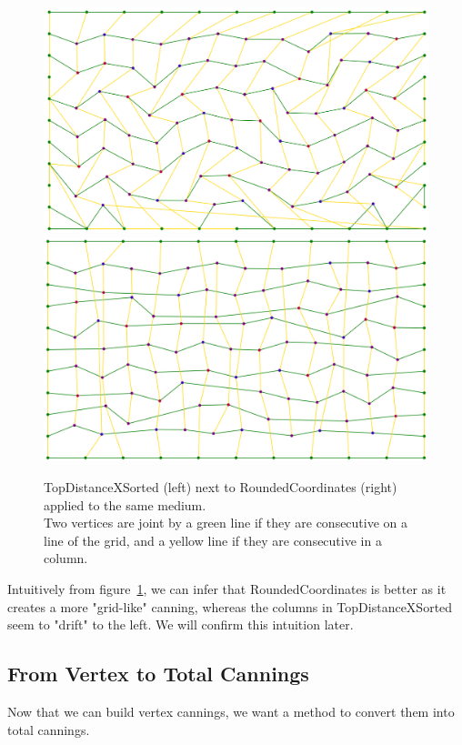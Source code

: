 \documentclass{article}
\begin{document}
\begin{figure}[h]
	\centering\includegraphics[width=0.45\linewidth]{assets/TopDistanceXSorted.png}
	\centering\includegraphics[width=0.45\linewidth]{assets/RoundedCoordinates.png}
	\caption{TopDistanceXSorted (left) next to RoundedCoordinates (right) applied to the same medium.\\
	Two vertices are joint by a green line if they are consecutive on a line of the grid, and a yellow line if they are consecutive in a column.}
	\label{fig:topdist_vs_rounded}
\end{figure}

Intuitively from figure~\ref{fig:topdist_vs_rounded}, we can infer that RoundedCoordinates is better as it creates a more "grid-like" canning, whereas the columns in TopDistanceXSorted seem to "drift" to the left. We will confirm this intuition later.

\subsection{From Vertex to Total Cannings}

Now that we can build vertex cannings, we want a method to convert them into total cannings.
\end{document}
